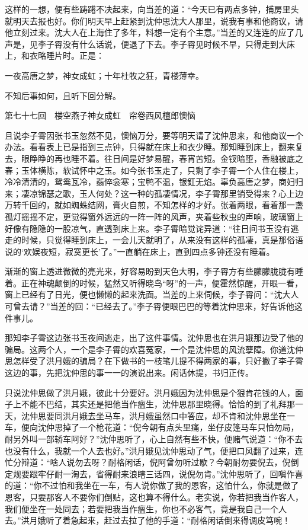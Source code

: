 \documentclass[12pt,UTF8]{ctexbook}
\begin{document}
{{{这样的一想，便有些踌躇不决起来，向当差的道：“今天已有两点多钟，捕房里头就明天去报也好。你们明天早上赶紧到沈仲思沈大人那里，说我有事和他商议，请他立刻过来。沈大人在上海住了多年，料想一定有个主意。”当差的又连连的应了几声是，见李子霄没有什么话说，便退了下去。李子霄见时候不早，只得走到大床上，和衣略睡片时。正是：

一夜高唐之梦，神女成虹；十年杜牧之狂，青楼薄幸。

不知后事如何，且听下回分解。





第七十七回　楼空燕子神女成虹　帘卷西风檀郎懊恼





且说李子霄因张书玉忽然不见，懊恼万分，要等明天请了沈仲思来，和他商议一个办法。看看表上已是指到三点钟，只得就在床上和衣少睡。那知睡到床上，翻来复去，眼睁睁的再也睡不着。往日间是好梦易醒，春宵苦短。金钗暗堕，香融被底之春；玉体横陈，软试怀中之玉。如今张书玉走了，只剩了李子霄一个人住在楼上，冷冷清清的，鸳鸯瓦冷，翡悴衾寒；宝鸭不温，银釭无焰。辜负高唐之梦，商妇归来；凄凉锦瑟之歌，玉人何处？这一种的孤凄情况，李子霄那里销受得来？心上边万转千回的，就如蜘蛛结网，膏火自煎，不知怎样的才好。张着两眼，看着那一盏孤灯摇摇不定，更觉得窗外远远的一阵一阵的风声，夹着些秋虫的声响，玻璃窗上好像有隐隐的一股凉气，直透到床上来。李子霄暗觉诧异道：“往日间书玉没有逃走的时候，只觉得睡到床上，一会儿天就明了，从来没有这样的孤凄，真是那俗语说的‘欢娱夜短，寂寞更长’了。”一直躺在床上，直到四点多钟还没有睡着。

渐渐的窗上透进微微的亮光来，好容易盼到天色大明，李子霄方有些朦朦胧胧有睡着。正在神魂颠倒的时候，猛然又听得晓鸟“呀”的一声，便霍然惊醒，开眼一看，窗上已经有了日光，便也懒懒的起来洗面。当差的上来伺候，李子霄问：“沈大人可曾去请？”当差的回：“已经去了。”李子霄便眼巴巴的等着沈仲思来，好告诉他这件事儿。

那知李子霄这边张书玉夜间逃走，出了这件事情。沈仲思也在洪月娥那边受了他的骗局。这两个人，一个是李子霄的欢喜冤家，一个是沈仲思的风流孽障。你道沈仲思怎样受了洪月娥的骗局？在下做书的一枝笔儿提不得两家的事，只好撇了李子霄这边的事，先把沈仲思的事一一的演说出来。闲话休提，书归正传。

只说沈仲思做了洪月娥，彼此十分要好。洪月娥因为沈仲思是个狠肯花钱的人，面子上不能不巴结，其实还是把他当作瘟生，沈仲思那里晓得。恰恰的到了礼拜那一天，沈仲思要同洪月娥去坐马车，洪月娥虽然口中答应，却不肯和沈仲思坐在一车，便向沈仲思掉了一个枪花道：“倪今朝有点头里痛，坐仔皮篷马车只怕勿局，耐另外叫一部轿车阿好？”沈仲思听了，心上自然有些不快，便赌气说道：“你不去也没有什么，我就一个人去也好。”洪月娥见沈仲思动了气，便把口风翻了过来，连忙分辩道：“啥人说勿去呀？耐格闲话，倪阿曾勿听过歇？今朝耐勿要倪去，倪倒定规要跟牢仔耐一淘去，省得耐来浪瞎三话四，说倪勿肯。”沈仲思听了，回嗔作喜的道：“你不过怕和我坐在一车，有人说你做了我的恩客，这怕什么，你就是做了恩客，只要那客人不要你们倒贴，这也算不得什么。老实说，你若把我当作客人，我们便坐在一处同去；若要把我当作瘟生，你也不必客气，竟是我自己一个人去。”洪月娥听了着急起来，赶过去拉了他的手道：“耐格闲话倒来得调皮笃啘！

}}}
\end{document}
